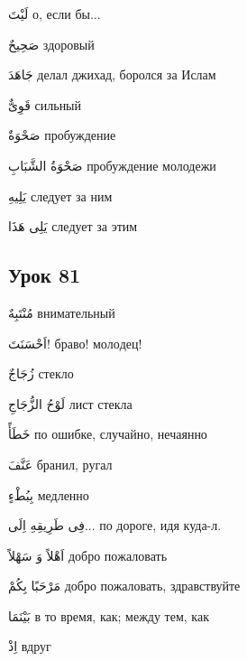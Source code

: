 \documentclass[a5paper]{article}
\newcommand\textstyleDropCaps[1]{#1}
\newcommand\textstyleCaptioncharacters[1]{#1}
\begin{document}
\textstyleCaptioncharacters{لَيْتَ }\textstyleDropCaps{о, если бы...‎}

\textstyleCaptioncharacters{صَحِيحٌ }\textstyleDropCaps{здоровый‎}

\textstyleCaptioncharacters{جَاهَدَ }\textstyleDropCaps{делал джихад, бо­ролся за Ислам‎}

\textstyleCaptioncharacters{قَوِىٌّ }\textstyleDropCaps{сильный‎}

\textstyleCaptioncharacters{صَحْوَةٌ }\textstyleDropCaps{пробуждение‎}

\textstyleCaptioncharacters{صَحْوَةُ الشَّبَابِ }\textstyleDropCaps{пробу­ждение молодежи‎}

\textstyleCaptioncharacters{يَلِيهِ }\textstyleDropCaps{следует за ним‎}

\textstyleCaptioncharacters{يَلِى هَذَا }\textstyleDropCaps{следует за этим‎}

\subsection[Урок 81‎]{\textstyleDropCaps{Урок 81‎}}
\textstyleCaptioncharacters{مُنْتَبِهٌ }\textstyleDropCaps{внимательный‎}

\textstyleCaptioncharacters{اَحْسَنَتَ!ِ }\textstyleDropCaps{браво! моло­дец!‎}

\textstyleCaptioncharacters{زُجَاجٌ }\textstyleDropCaps{стекло‎}

\textstyleCaptioncharacters{لَوْحُ الزُّجَاجِ }\textstyleDropCaps{лист стекла‎}

\textstyleCaptioncharacters{خَطَأً }\textstyleDropCaps{по ошибке, случай­но, нечаянно‎}

\textstyleCaptioncharacters{عَنَّفَ }\textstyleDropCaps{бранил, ругал‎}

\textstyleCaptioncharacters{بِبُطْءٍ }\textstyleDropCaps{медленно‎}

\textstyleCaptioncharacters{فِى طَرِيقِهِ اِلَى...ِ }\textstyleDropCaps{по до­роге, идя куда-л.‎}

\textstyleCaptioncharacters{اَهْلاً وَ سَهْلاً }\textstyleDropCaps{добро по­жаловать‎}

\textstyleCaptioncharacters{مَرْحَبًا بِكُمْ }\textstyleDropCaps{добро пожа­ловать, здравствуйте‎}

\textstyleCaptioncharacters{بَيْنَمَا }\textstyleDropCaps{в то время, как; меж­ду тем, как‎}

\textstyleCaptioncharacters{اِذْ }\textstyleDropCaps{вдруг‎}
\end{document}
